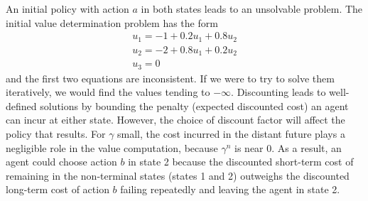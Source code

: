 \documentclass[11pt, a4paper]{exam}
\begin{document}
\begin{exercises}
\begin{parts}
    \begin{solution}
        An initial policy with action $a$ in both states leads to an unsolvable problem. The initial value determination problem has the form \[\begin{array}{l}{u_{1}=-1+0.2 u_{1}+0.8 u_{2}} \\ {u_{2}=-2+0.8 u_{1}+0.2 u_{2}} \\ {u_{3}=0}\end{array}\] and the first two equations are inconsistent. If we were to try to solve them iteratively, we would find the values tending to $-\infty$. Discounting leads to well-defined solutions by bounding the penalty (expected discounted cost) an agent can incur at either state. However, the choice of discount factor will affect the policy that results. For $\gamma$ small, the cost incurred in the distant future plays a negligible role in the value computation, because $\gamma^n$ is near $0$. As a result, an agent could choose action $b$ in state 2 because the discounted short-term cost of remaining in the non-terminal states (states 1 and 2) outweighs the discounted long-term cost of action $b$ failing repeatedly and leaving the agent in state 2.
    \end{solution}
\end{parts}

\end{exercises}
\end{document}
